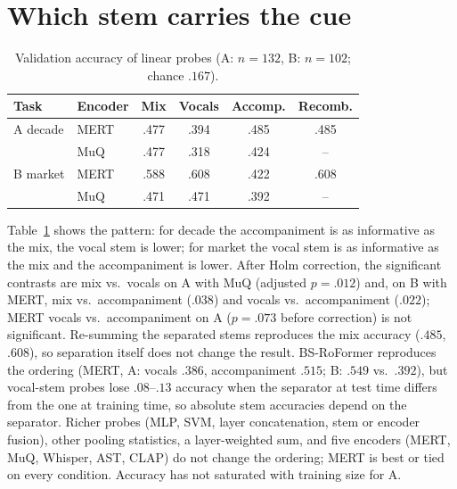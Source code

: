 \documentclass[10pt,twocolumn]{article}
\begin{document}
\section{Which stem carries the cue}
\begin{table}[t]\centering\small
\caption{Validation accuracy of linear probes (A: $n{=}132$, B: $n{=}102$; chance $.167$).}\label{tab:stems}
\begin{tabular}{@{}llcccc@{}}\toprule
Task & Encoder & Mix & Vocals & Accomp. & Recomb.\\\midrule
A decade & MERT & .477 & .394 & .485 & .485\\
 & MuQ & .477 & .318 & .424 & --\\
B market & MERT & .588 & .608 & .422 & .608\\
 & MuQ & .471 & .471 & .392 & --\\\bottomrule
\end{tabular}
\end{table}

Table~\ref{tab:stems} shows the pattern: for decade the accompaniment is as informative as the mix, the vocal stem is lower; for market the vocal stem is as informative as the mix and the accompaniment is lower. After Holm correction, the significant contrasts are mix vs.\ vocals on A with MuQ (adjusted $p{=}.012$) and, on B with MERT, mix vs.\ accompaniment ($.038$) and vocals vs.\ accompaniment ($.022$); MERT vocals vs.\ accompaniment on A ($p{=}.073$ before correction) is not significant. Re-summing the separated stems reproduces the mix accuracy ($.485$, $.608$), so separation itself does not change the result. BS-RoFormer reproduces the ordering (MERT, A: vocals $.386$, accompaniment $.515$; B: $.549$ vs.\ $.392$), but vocal-stem probes lose $.08$--$.13$ accuracy when the separator at test time differs from the one at training time, so absolute stem accuracies depend on the separator. Richer probes (MLP, SVM, layer concatenation, stem or encoder fusion), other pooling statistics, a layer-weighted sum, and five encoders (MERT, MuQ, Whisper, AST, CLAP) do not change the ordering; MERT is best or tied on every condition. Accuracy has not saturated with training size for A.
\end{document}
